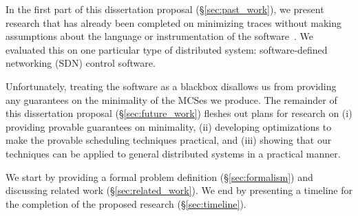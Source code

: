 In the first part of this dissertation proposal (\S\ref{sec:past_work}), we present research that has
already been completed on minimizing traces without making assumptions about the language
or instrumentation of the software~\cite{sts2014}. We evaluated this on one
particular type of distributed system: software-defined networking
(SDN) control software.


Unfortunately, treating the software as a blackbox disallows us from
providing any guarantees on the minimality of the MCSes we produce.
The remainder of this dissertation proposal (\S\ref{sec:future_work}) fleshes out plans for research on
(i) providing provable guarantees on minimality, (ii) developing optimizations
to make the provable scheduling techniques practical, and (iii) showing
that our techniques can be applied to general distributed systems in a
practical manner.

We start by providing a formal problem definition (\S\ref{sec:formalism}) and
discussing related work (\S\ref{sec:related_work}). We end by
presenting a timeline for the completion of the proposed research (\S\ref{sec:timeline}).
